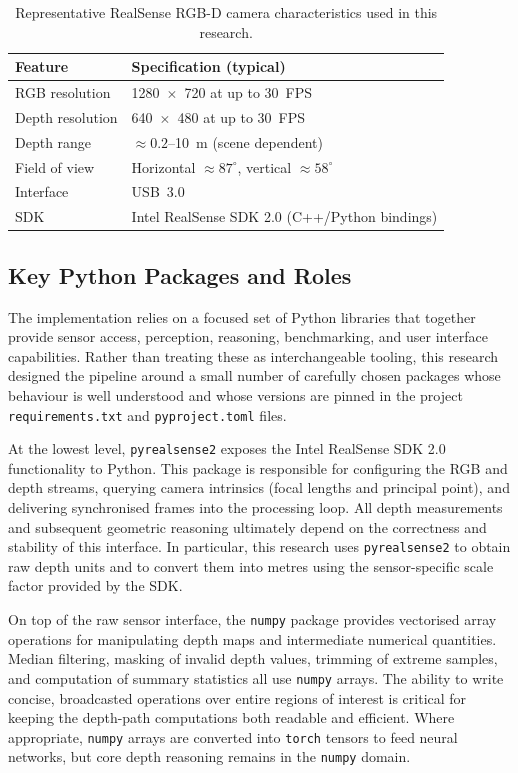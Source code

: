 \documentclass[11pt,a4paper]{article}
\newcommand{\code}[1]{\texttt{#1}}
\begin{document}
\begin{table}[h]
  \centering
  \small
  \begin{tabular}{l p{8cm}}
    \toprule
    Feature & Specification (typical) \\
    \midrule
    RGB resolution & 1280~\(\times\)~720 at up to 30~FPS \\
    Depth resolution & 640~\(\times\)~480 at up to 30~FPS \\
    Depth range & \(\approx 0.2\)--10~m (scene dependent) \\
    Field of view & Horizontal \(\approx 87^\circ\), vertical \(\approx 58^\circ\) \\
    Interface & USB~3.0 \\
    SDK & Intel RealSense SDK 2.0 (C++/Python bindings) \\
    \bottomrule
  \end{tabular}
  \caption{Representative RealSense RGB-D camera characteristics used in this research.}
  \label{tab:realsense-spec}
\end{table}

\subsection{Key Python Packages and Roles}
The implementation relies on a focused set of Python libraries that together provide sensor access, perception, reasoning, benchmarking, and user interface capabilities. Rather than treating these as interchangeable tooling, this research designed the pipeline around a small number of carefully chosen packages whose behaviour is well understood and whose versions are pinned in the project \code{requirements.txt} and \code{pyproject.toml} files.

At the lowest level, \code{pyrealsense2} exposes the Intel RealSense SDK 2.0 functionality to Python. This package is responsible for configuring the RGB and depth streams, querying camera intrinsics (focal lengths and principal point), and delivering synchronised frames into the processing loop. All depth measurements and subsequent geometric reasoning ultimately depend on the correctness and stability of this interface. In particular, this research uses \code{pyrealsense2} to obtain raw depth units and to convert them into metres using the sensor-specific scale factor provided by the SDK.

On top of the raw sensor interface, the \code{numpy} package provides vectorised array operations for manipulating depth maps and intermediate numerical quantities. Median filtering, masking of invalid depth values, trimming of extreme samples, and computation of summary statistics all use \code{numpy} arrays. The ability to write concise, broadcasted operations over entire regions of interest is critical for keeping the depth-path computations both readable and efficient. Where appropriate, \code{numpy} arrays are converted into \code{torch} tensors to feed neural networks, but core depth reasoning remains in the \code{numpy} domain.
\end{document}
